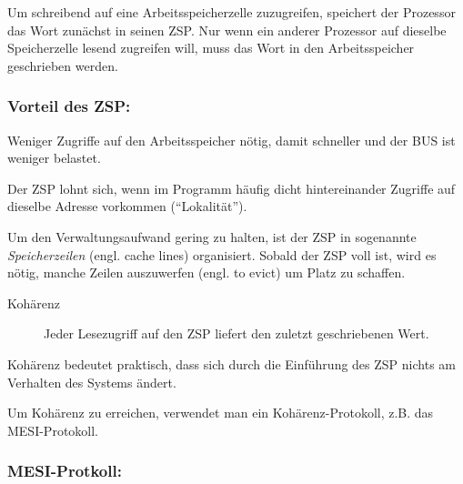 Um schreibend auf eine Arbeitsspeicherzelle zuzugreifen, speichert der Prozessor das Wort zunächst in seinen ZSP. Nur wenn ein anderer Prozessor auf dieselbe Speicherzelle lesend zugreifen will, muss das Wort in den Arbeitsspeicher geschrieben werden.

\subsubsection*{Vorteil des ZSP:}
Weniger Zugriffe auf den Arbeitsspeicher nötig, damit schneller und der BUS ist weniger belastet.

Der ZSP lohnt sich, wenn im Programm häufig dicht hintereinander Zugriffe auf dieselbe Adresse vorkommen ("`Lokalität"').

Um den Verwaltungsaufwand gering zu halten, ist der ZSP in sogenannte \emph{Speicherzeilen} (engl. cache lines) organisiert. Sobald der ZSP voll ist, wird es nötig, manche Zeilen auszuwerfen (engl. to evict) um Platz zu schaffen.

\begin{description}
	\item[Kohärenz] Jeder Lesezugriff auf den ZSP liefert den zuletzt geschriebenen Wert.
\end{description}

Kohärenz bedeutet praktisch, dass sich durch die Einführung des ZSP nichts am Verhalten des Systems ändert.

Um Kohärenz zu erreichen, verwendet man ein Kohärenz-Protokoll, z.B. das MESI-Protokoll.

\subsubsection*{MESI-Protkoll:}


